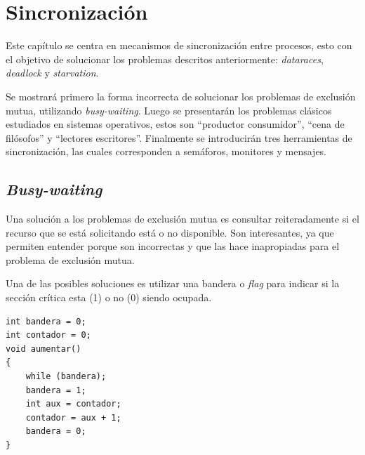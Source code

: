 %
%
%
%


\chapter{Sincronización}
\label{sincronizacion}

Este capítulo se centra en mecanismos de sincronización entre procesos, esto
con el objetivo de solucionar los problemas descritos anteriormente:
\emph{dataraces}, \emph{deadlock} y \emph{starvation}.

Se mostrará primero la forma incorrecta de solucionar los problemas de exclusión
mutua, utilizando \emph{busy-waiting}. Luego se presentarán los problemas
clásicos estudiados en sistemas operativos, estos son ``productor consumidor'',
``cena de filósofos'' y ``lectores escritores''. Finalmente se introducirán tres
herramientas de sincronización, las cuales corresponden a semáforos, monitores y
mensajes.

\section{\emph{Busy-waiting}}
Una solución a los problemas de exclusión mutua es consultar reiteradamente si
el recurso que se está solicitando está o no disponible. Son interesantes, ya
que permiten entender porque son incorrectas y que las hace inapropiadas para el
problema de exclusión mutua.

Una de las posibles soluciones es utilizar una bandera o \emph{flag} para
indicar si la sección crítica esta (1) o no (0) siendo ocupada.

\begin{lstlisting}
int bandera = 0;
int contador = 0;
void aumentar()
{
	while (bandera);
	bandera = 1;
	int aux = contador;
	contador = aux + 1;
	bandera = 0;
}
\end{lstlisting}

